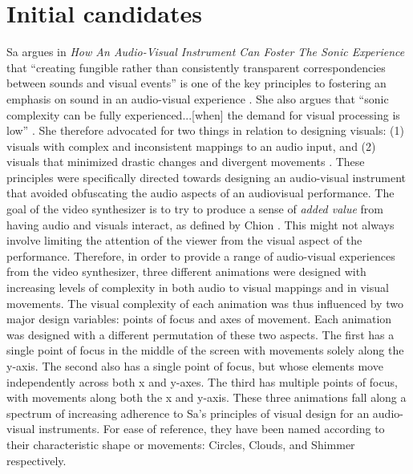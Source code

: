 \documentclass[../initial_thesis.tex]{subfiles}
\begin{document}
\section{Initial candidates} \label{sec:initialcandidates}
Sa argues in \textit{How An Audio-Visual Instrument Can Foster The Sonic Experience} that ``creating fungible rather than consistently transparent correspondencies between sounds and visual events'' is one of the key principles to fostering an emphasis on sound in an audio-visual experience \cite{Sa2013}. She also argues that ``sonic complexity can be fully experienced...[when] the demand for visual processing is low'' \cite{Sa2013}. She therefore advocated for two things in relation to designing visuals: (1) visuals with complex and inconsistent mappings to an audio input, and (2) visuals that minimized drastic changes and divergent movements \cite{Sa2013}. These principles were specifically directed towards designing an audio-visual instrument that avoided obfuscating the audio aspects of an audiovisual performance. The goal of the video synthesizer is to try to produce a sense of \emph{added value} from having audio and visuals interact, as defined by Chion \cite{Chion1994}. This might not always involve limiting the attention of the viewer from the visual aspect of the performance. Therefore, in order to provide a range of audio-visual experiences from the video synthesizer, three different animations were designed with increasing levels of complexity in both audio to visual mappings and in visual movements. The visual complexity of each animation was thus influenced by two major design variables: points of focus and axes of movement. Each animation was designed with a different permutation of these two aspects. The first has a single point of focus in the middle of the screen with movements solely along the y-axis. The second also has a single point of focus, but whose elements move independently across both x and y-axes. The third has multiple points of focus, with movements along both the x and y-axis. These three animations fall along a spectrum of increasing adherence to Sa's principles of visual design for an audio-visual instruments. For ease of reference, they have been named according to their characteristic shape or movements: Circles, Clouds, and Shimmer respectively.
\end{document}
